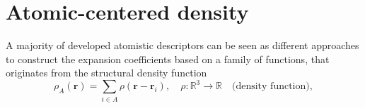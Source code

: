 \section{Atomic-centered density}
\label{sec:environment}
A majority of developed atomistic descriptors can be seen as different approaches to construct the expansion coefficients based on a family of functions, that originates from the structural density function\cite{musil2021physics} 
\begin{equation}
  \label{eq:basis_expansion}
  \rho_A(\mathbf{r}) = \sum_{i\in A} \rho(\mathbf{r}-\mathbf{r}_i),\quad \rho:\mathbb{R}^3\rightarrow\mathbb{R}\quad\text{(density function)},
\end{equation}
